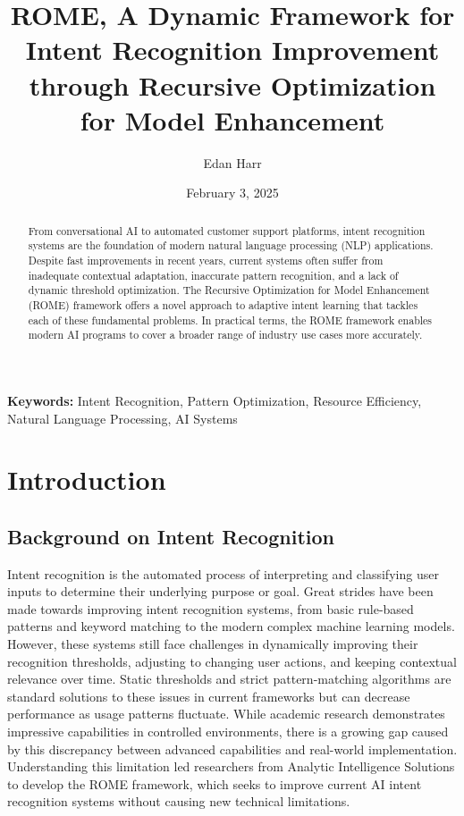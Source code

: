 \documentclass[12pt]{article}
\title{ROME, A Dynamic Framework for Intent Recognition Improvement through Recursive Optimization for Model Enhancement}
\author[1]{Edan Harr}
\affil[1]{Analytic Intelligence Solutions}
\date{February 3, 2025}
\begin{document}
\maketitle

\begin{abstract}
From conversational AI to automated customer support platforms, intent recognition systems are the foundation of modern natural language processing (NLP) applications. Despite fast improvements in recent years, current systems often suffer from inadequate contextual adaptation, inaccurate pattern recognition, and a lack of dynamic threshold optimization. The Recursive Optimization for Model Enhancement (ROME) framework offers a novel approach to adaptive intent learning that tackles each of these fundamental problems. In practical terms, the ROME framework enables modern AI programs to cover a broader range of industry use cases more accurately.
\end{abstract}

\noindent\textbf{Keywords:} Intent Recognition, Pattern Optimization, Resource Efficiency, Natural Language Processing, AI Systems

\section{Introduction}

\subsection{Background on Intent Recognition}
Intent recognition is the automated process of interpreting and classifying user inputs to determine their underlying purpose or goal. Great strides have been made towards improving intent recognition systems, from basic rule-based patterns and keyword matching to the modern complex machine learning models. However, these systems still face challenges in dynamically improving their recognition thresholds, adjusting to changing user actions, and keeping contextual relevance over time. Static thresholds and strict pattern-matching algorithms are standard solutions to these issues in current frameworks but can decrease performance as usage patterns fluctuate. While academic research demonstrates impressive capabilities in controlled environments, there is a growing gap caused by this discrepancy between advanced capabilities and real-world implementation. Understanding this limitation led researchers from Analytic Intelligence Solutions to develop the ROME framework, which seeks to improve current AI intent recognition systems without causing new technical limitations.
\end{document}
